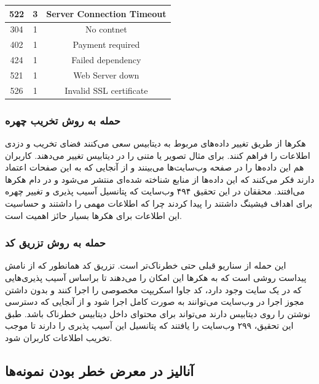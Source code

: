 \documentclass[10pt, a4paper]{article}
\begin{document}
\begin{LTR}
\begin{table}[h]
{\begin{tabular}{|c|c|c|}
                522 & 3 & Server Connection Timeout \\ \hline
                304 & 1 & No contnet \\ \hline
                402 & 1 & Payment required \\ \hline
                424 & 1 & Failed dependency \\ \hline
                521 & 1 & Web Server down \\ \hline
                526 & 1 & Invalid SSL certificate \\ \hline
            \end{tabular}
        }
    \end{table}
\end{LTR}

\subsubsection{حمله به روش تخریب چهره}

هکر‌ها از طریق تغییر داده‌های مربوط به دیتابیس سعی می‌کنند فضای تخریب و دزدی
اطلاعات را فراهم کنند. برای مثال تصویر یا متنی را در دیتابیس تغییر می‌دهند.
کاربران هم این داده‌ها را در صفحه وب‌سایت‌ها می‌بینند و از آنجایی که به این
صفحات اعتماد دارند فکر می‌کنند که این داده‌ها از منابع شناخته شده‌ای منتشر
می‌شود و در دام هکر‌ها می‌افتند. محققان در این تحقیق ۴۹۴ وب‌سایت که پتانسیل آسیب
پذیری و تغییر چهره برای اهداف فیشینگ داشتند را پیدا کردند چرا که اطلاعات مهمی را
داشتند و حساسیت این اطلاعات برای هکر‌ها بسیار حائز اهمیت است.

\subsubsection{حمله به روش تزریق کد}

این حمله از سناریو قبلی حتی خطرناک‌تر است. تزریق کد همانطور که از نامش پیداست
روشی است که به هکر‌ها این امکان را می‌دهند تا براساس آسیب پذیری‌هایی که در یک
سایت وجود دارد، کد جاوا اسکریپت مخصوصی را اجرا کنند و بدون داشتن مجوز اجرا در
وب‌سایت می‌توانند به صورت کامل اجرا شود و از آنجایی که دسترسی نوشتن را روی
دیتابیس دارند می‌تواند برای محتوای داخل دیتابیس خطرناک باشد. طبق این تحقیق، ۲۹۹
وب‌سایت را یافتند که پتانسیل این آسیب پذیری را دارند تا موجب تخریب اطلاعات
کاربران شود.

\newpage

\subsection{آنالیز در معرض خطر بودن نمونه‌ها}
\end{document}
